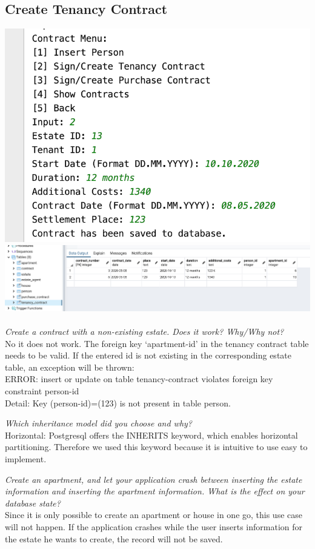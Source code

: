 \documentclass[ngerman]{dis-template-add}
\begin{document}
\subsection*{Create Tenancy Contract}
\includegraphics[scale=.5]{contract_app} \\
\includegraphics[scale=.4]{contract_db} \\ \\


\textit{Create a contract with a non-existing estate. Does it work? Why/Why not?
} \\
No it does not work. The foreign key `apartment-id' in the tenancy contract table needs to be valid. If the entered id is not existing in the corresponding estate table, an exception will be thrown: \\
ERROR: insert or update on table tenancy-contract violates foreign key constraint person-id \\
Detail: Key (person-id)=(123) is not present in table person.

\textit{Which inheritance model did you choose and why?
} \\
Horizontal: Postgresql offers the INHERITS keyword, which enables horizontal partitioning. Therefore we used this keyword because it is intuitive to use easy to implement.

\textit{Create an apartment, and let your application crash between inserting the estate information and inserting the apartment information. What is the effect on your database state?
} \\
Since it is only possible to create an apartment or house in one go, this use case will not happen.
If the application crashes while the user inserts information for the estate he wants to create, the record will not be saved.
\end{document}
